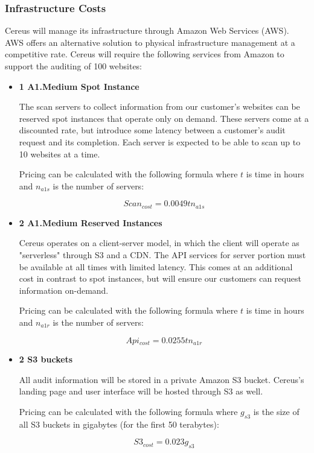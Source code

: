 \subsubsection{Infrastructure Costs}

Cereus will manage its infrastructure through Amazon Web Services (AWS). AWS offers an alternative solution to physical infrastructure management at a competitive rate. Cereus will require the following services from Amazon to support the auditing of 100 websites:

\begin{itemize}

\item \textbf{1 A1.Medium Spot Instance}

The scan servers to collect information from our customer's websites can be reserved spot instances that operate only on demand. These servers come at a discounted rate, but introduce some latency between a customer's audit request and its completion. Each server is expected to be able to scan up to 10 websites at a time.

Pricing can be calculated with the following formula where \( t \) is time in hours and \( n_{a1s} \) is the number of servers:

\[ Scan_{cost} = 0.0049tn_{a1s} \]

\item \textbf{2 A1.Medium Reserved Instances}

Cereus operates on a client-server model, in which the client will operate as "serverless" through S3 and a CDN. The API services for server portion must be available at all times with limited latency. This comes at an additional cost in contrast to spot instances, but will ensure our customers can request information on-demand. 

Pricing can be calculated with the following formula where \( t \) is time in hours and \( n_{a1r} \) is the number of servers:

\[ Api_{cost} = 0.0255tn_{a1r} \]

\item \textbf{2 S3 buckets}

All audit information will be stored in a private Amazon S3 bucket. Cereus's landing page and user interface will be hosted through S3 as well.

Pricing can be calculated with the following formula where \( g_{s3} \) is the size of all S3 buckets in gigabytes (for the first 50 terabytes):

\[ S3_{cost} = 0.023g_{s3} \]


\end{itemize}
